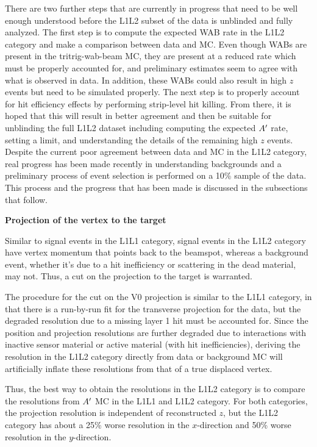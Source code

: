 There are two further steps that are currently in progress that need to be well enough understood before the L1L2 subset of the data is unblinded and fully analyzed. The first step is to compute the expected WAB rate in the L1L2 category and make a comparison between data and MC. Even though WABs are present in the tritrig-wab-beam MC, they are present at a reduced rate which must be properly accounted for, and preliminary estimates seem to agree with what is observed in data. In addition, these WABs could also result in high $z$ events but need to be simulated properly. The next step is to properly account for hit efficiency effects by performing strip-level hit killing. From there, it is hoped that this will result in better agreement and then be suitable for unblinding the full L1L2 dataset including computing the expected $A^\prime$ rate, setting a limit, and understanding the details of the remaining high $z$ events. Despite the current poor agreement between data and MC in the L1L2 category, real progress has been made recently in understanding backgrounds and a preliminary process of event selection is performed on a 10\% sample of the data. This process and the progress that has been made is discussed in the subsections that follow.


\clearpage

\textbf{Projection of the vertex to the target}

Similar to signal events in the L1L1 category, signal events in the L1L2 category have vertex momentum that points back to the beamspot, whereas a background event, whether it's due to a hit inefficiency or scattering in the dead material, may not. Thus, a cut on the projection to the target is warranted. %

The procedure for the cut on the V0 projection is similar to the L1L1 category, in that there is a run-by-run fit for the transverse projection for the data, but the degraded resolution due to a missing layer 1 hit must be accounted for. Since the position and projection resolutions are further degraded due to interactions with inactive sensor material or active material (with hit inefficiencies), deriving the resolution in the L1L2 category directly from data or background MC will artificially inflate these resolutions from that of a true displaced vertex.

Thus, the best way to obtain the resolutions in the L1L2 category is to compare the resolutions from $A^\prime$ MC in the L1L1 and L1L2 category. For both categories, the projection resolution is independent of reconstructed $z$, but the L1L2 category has about a 25\% worse resolution in the $x$-direction and 50\%  worse resolution in the $y$-direction. %

